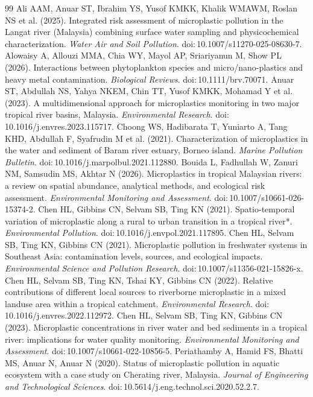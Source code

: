 \documentclass[11pt,a4paper]{article}
\begin{document}
\begin{thebibliography}{99}\small
{} Ali AAM, Anuar ST, Ibrahim YS, Yusof KMKK, Khalik WMAWM, Roslan NS et al. (2025). Integrated risk assessment of microplastic pollution in the Langat river (Malaysia) combining surface water sampling and physicochemical characterization. \textit{Water Air and Soil Pollution}. doi:\,10.1007/s11270-025-08630-7.
 Alowaisy A, Allouzi MMA, Chia WY, Mayol AP, Sriariyanun M, Show PL (2026). Interactions between phytoplankton species and micro/nano-plastics and heavy metal contamination. \textit{Biological Reviews}. doi:\,10.1111/brv.70071.
 Anuar ST, Abdullah NS, Yahya NKEM, Chin TT, Yusof KMKK, Mohamad Y et al. (2023). A multidimensional approach for microplastics monitoring in two major tropical river basins, Malaysia. \textit{Environmental Research}. doi:\,10.1016/j.envres.2023.115717.
 Choong WS, Hadibarata T, Yuniarto A, Tang KHD, Abdullah F, Syafrudin M et al. (2021). Characterization of microplastics in the water and sediment of Baram river estuary, Borneo island. \textit{Marine Pollution Bulletin}. doi:\,10.1016/j.marpolbul.2021.112880.
 Bouida L, Fadhullah W, Zanuri NM, Samsudin MS, Akhtar N (2026). Microplastics in tropical Malaysian rivers: a review on spatial abundance, analytical methods, and ecological risk assessment. \textit{Environmental Monitoring and Assessment}. doi:\,10.1007/s10661-026-15374-2.
 Chen HL, Gibbins CN, Selvam SB, Ting KN (2021). Spatio-temporal variation of microplastic along a rural to urban transition in a tropical river*. \textit{Environmental Pollution}. doi:\,10.1016/j.envpol.2021.117895.
 Chen HL, Selvam SB, Ting KN, Gibbins CN (2021). Microplastic pollution in freshwater systems in Southeast Asia: contamination levels, sources, and ecological impacts. \textit{Environmental Science and Pollution Research}. doi:\,10.1007/s11356-021-15826-x.
 Chen HL, Selvam SB, Ting KN, Tshai KY, Gibbins CN (2022). Relative contributions of different local sources to riverborne microplastic in a mixed landuse area within a tropical catchment. \textit{Environmental Research}. doi:\,10.1016/j.envres.2022.112972.
 Chen HL, Selvam SB, Ting KN, Gibbins CN (2023). Microplastic concentrations in river water and bed sediments in a tropical river: implications for water quality monitoring. \textit{Environmental Monitoring and Assessment}. doi:\,10.1007/s10661-022-10856-5.
 Periathamby A, Hamid FS, Bhatti MS, Anuar N, Anuar N (2020). Status of microplastic pollution in aquatic ecosystem with a case study on Cherating river, Malaysia. \textit{Journal of Engineering and Technological Sciences}. doi:\,10.5614/j.eng.technol.sci.2020.52.2.7.

\end{thebibliography}
\end{document}
